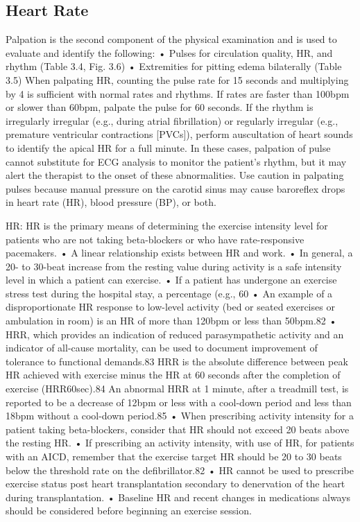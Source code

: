 \subsection{Heart Rate} 
Palpation is the second component of the physical examination and is used to evaluate and identify the following:
•	Pulses for circulation quality, HR, and rhythm (Table 3.4, Fig. 3.6)
•	Extremities for pitting edema bilaterally (Table 3.5)
When palpating HR, counting the pulse rate for 15 seconds and multiplying by 4 is sufficient with normal rates and rhythms. If rates are faster than 100bpm or slower than 60bpm, palpate the pulse for 60 seconds. If the rhythm is irregularly irregular (e.g., during atrial fibrillation) or regularly irregular (e.g., premature ventricular contractions [PVCs]), perform auscultation of heart sounds to identify the apical HR for a full minute. In these cases, palpation of pulse cannot substitute for ECG analysis to monitor the patient’s rhythm, but it may alert the therapist to the onset of these abnormalities.
Use caution in palpating pulses because manual pressure on the carotid sinus may cause baroreflex drops in heart rate (HR), blood pressure (BP), or both.

HR: HR is the primary means of determining the exercise intensity level for patients who are not taking beta-blockers or who have rate-responsive pacemakers.
•	A linear relationship exists between HR and work.
•	In general, a 20- to 30-beat increase from the resting value during activity is a safe intensity level in which a patient can exercise.
•	If a patient has undergone an exercise stress test during the hospital stay, a percentage (e.g., 60%
•	An example of a disproportionate HR response to low-level activity (bed or seated exercises or ambulation in room) is an HR of more than 120bpm or less than 50bpm.82
•	HRR, which provides an indication of reduced parasympathetic activity and an indicator of all-cause mortality, can be used to document improvement of tolerance to functional demands.83 HRR is the absolute difference between peak HR achieved with exercise minus the HR at 60 seconds after the completion of exercise (HRR60sec).84 An abnormal HRR at 1 minute, after a treadmill test, is reported to be a decrease of 12bpm or less with a cool-down period and less than 18bpm without a cool-down period.85
•	When prescribing activity intensity for a patient taking beta-blockers, consider that HR should not exceed 20 beats above the resting HR.
•	If prescribing an activity intensity, with use of HR, for patients with an AICD, remember that the exercise target HR should be 20 to 30 beats below the threshold rate on the defibrillator.82
•	HR cannot be used to prescribe exercise status post heart transplantation secondary to denervation of the heart during transplantation.
•	Baseline HR and recent changes in medications always should be considered before beginning an exercise session.



